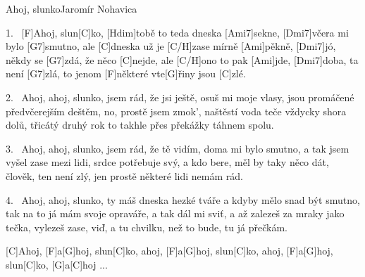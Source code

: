 
\begin{song}{Ahoj, slunko}{Jaromír Nohavica}

\begin{xverse}{1.~}
[F]Ahoj, slun[C]ko, [Hdim]tobě to teda dneska [Ami7]sekne,
[Dmi7]včera mi bylo [G7]smutno, ale [C]dneska už je [C/H]zase mírně [Ami]pěkně,
[Dmi7]jó, někdy se [G7]zdá, že něco [C]nejde, ale [C/H]ono to pak [Ami]jde,
[Dmi7]doba, ta není [G7]zlá, to jenom [F]některé vte[G]{ři}ny jsou [C]zlé.
\end{xverse}

\begin{xverse}{2.~}
Ahoj, ahoj, slunko, jsem rád, že jsi ještě,
osuš mi moje vlasy, jsou promáčené předvčerejším deštěm,
no, prostě jsem zmok', naštěstí voda teče vždycky shora dolů,
třicátý druhý rok to takhle přes překážky táhnem spolu.
\end{xverse}

\begin{xverse}{3.~}
Ahoj, ahoj, slunko, jsem rád, že tě vidím,
doma mi bylo smutno, a tak jsem vyšel zase mezi lidi,
srdce potřebuje svý, a kdo bere, měl by taky něco dát,
člověk, ten není zlý, jen prostě některé lidi nemám rád.
\end{xverse}

\begin{xverse}{4.~}
Ahoj, ahoj, slunko, ty máš dneska hezké tváře
a kdyby mělo snad být smutno, tak na to já mám svoje opraváře,
a tak dál mi sviť, a až zalezeš za mraky jako tečka,
vylezeš zase, viď, a tu chvilku, než to bude, tu já přečkám.
\end{xverse}

\begin{xverse}{}
[C]Ahoj, [F]a[G]hoj, slun[C]ko, ahoj, [F]a[G]hoj, slun[C]ko,
ahoj, [F]a[G]hoj, slun[C]ko, [G]a[C]hoj ...
\end{xverse}

\end{song}


